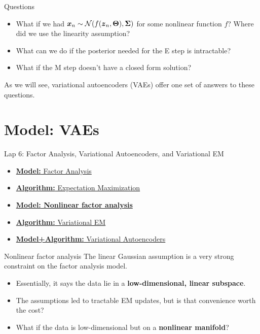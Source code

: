 \documentclass[aspectratio=169]{beamer}
\begin{document}
\begin{frame}{Questions}
    \begin{itemize}
        \item What if we had $\boldsymbol{x}_{n} \sim \mathcal{N}(f(\boldsymbol{z}_n, \boldsymbol{\Theta}), \boldsymbol{\Sigma})$ for some nonlinear function $f$? Where did we use the linearity assumption?
        
        \item What can we do if the posterior needed for the E step is intractable?
        
        \item What if the M step doesn't have a closed form solution?
    \end{itemize}
    
    As we will see, variational autoencoders (VAEs) offer one set of answers to these questions.
\end{frame}


\section{Model: VAEs}
\label{sec:vaes}

\begin{frame}{Lap 6: Factor Analysis, Variational Autoencoders, and Variational EM}
\begin{itemize}
    \item \hyperref[sec:fa]{\textbf{Model:} Factor Analysis}
    \item \hyperref[sec:em]{\textbf{Algorithm:} Expectation Maximization}
    \item \textbf{\hyperref[sec:vaes]{\textbf{Model:} Nonlinear factor analysis}}
    \item \hyperref[sec:vem]{\textbf{Algorithm:} Variational EM}
    \item \hyperref[sec:vaes]{\textbf{Model+Algorithm:} Variational Autoencoders}
\end{itemize}
\end{frame}

\begin{frame}{Nonlinear factor analysis}
The linear Gaussian assumption is a very strong constraint on the factor analysis model.
\begin{itemize}
    \item Essentially, it says the data lie in a \textbf{low-dimensional, linear subspace}.
    \item The assumptions led to tractable EM updates, but is that convenience worth the cost?
    \item What if the data is low-dimensional but on a \textbf{nonlinear manifold}?
\end{itemize}
\end{frame}
\end{document}
